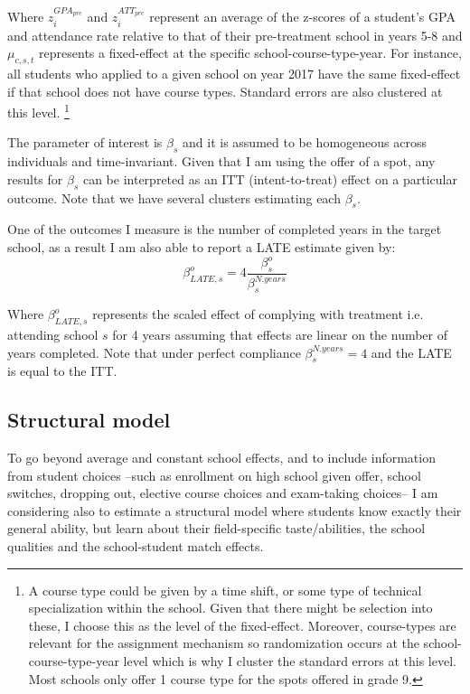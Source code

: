 \documentclass[12pt]{article}
\begin{document}
Where $z^{GPA_{pre}}_i $ and $ z^{ATT_{pre}}_i $ represent an average of the z-scores of a student's GPA and attendance rate relative to that of their pre-treatment school in years 5-8 and $\mu_{c,s,t}$ represents a fixed-effect at the specific school-course-type-year. For instance, all students who applied to a given school on year 2017 have the same fixed-effect if that school does not have course types.  Standard errors are also clustered at this level.  \footnote{A course type could be given by a time shift, or some type of technical specialization within the school. Given that there might be selection into these, I choose this as the level of the fixed-effect. Moreover,  course-types are relevant for the assignment mechanism so randomization occurs at the school-course-type-year level  which is why I cluster the standard errors at this level. Most schools only offer 1 course type for the spots offered in grade 9. } 

The parameter of interest is $\beta_s$ and it is assumed to be homogeneous across individuals and time-invariant. Given that I am using the offer of a spot, any results for $\beta_s$ can be interpreted as an ITT (intent-to-treat) effect on a particular outcome. Note that we have several clusters estimating each $\beta_s$.

One of the outcomes I measure is the number of completed years in the target school, as a result I am also able to report a LATE estimate given by: 
\[\beta^o_{LATE, s} = 4 \frac{\beta^o_s}{\beta^{N. years}_s} \]

Where  $\beta^o_{LATE, s}$ represents the scaled effect of complying with treatment i.e. attending school $s$ for 4 years assuming that effects are linear on the number of years completed. Note that under perfect compliance $\beta^{N. years}_s = 4$ and the LATE is equal to the ITT.


\subsection{Structural model}

To go beyond average and constant school effects, and to include information from student choices --such as enrollment on high school given offer, school switches, dropping out, elective course choices and exam-taking choices-- I am considering also to estimate a structural model where students know exactly their general ability, but learn about  their field-specific taste/abilities, the school qualities and the school-student match effects.
\end{document}
